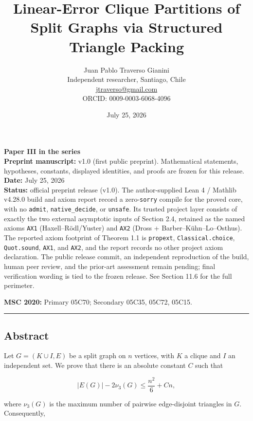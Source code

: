 \documentclass[
  11pt,
]{article}
\title{Linear-Error Clique Partitions of Split Graphs via Structured
Triangle Packing}
\author{Juan Pablo Traverso Gianini\\
\small Independent researcher, Santiago, Chile\\
\small \href{mailto:jtraverso@gmail.com}{jtraverso@gmail.com}\\
\small ORCID: 0009-0003-6068-4096}
\date{July 25, 2026}
\begin{document}
\sloppy
\raggedbottom
\maketitle

\begin{small}\begin{raggedright}
\textbf{Paper III in the series}\\
\textbf{Preprint manuscript:} v1.0 (first public preprint). Mathematical statements, hypotheses, constants, displayed identities, and proofs are frozen for this release.\\
\textbf{Date:} July 25, 2026\\
\textbf{Status:} official preprint release (v1.0). The author-supplied Lean 4 / Mathlib v4.28.0 build and axiom report record a zero-\texttt{sorry} compile for the proved core, with no \texttt{admit}, \texttt{native\_decide}, or \texttt{unsafe}. Its trusted project layer consists of exactly the two external asymptotic inputs of Section 2.4, retained as the named axioms \texttt{AX1} (Haxell--Rödl/Yuster) and \texttt{AX2} (Dross + Barber--Kühn--Lo--Osthus). The reported axiom footprint of Theorem 1.1 is \texttt{propext}, \texttt{Classical.choice}, \texttt{Quot.sound}, \texttt{AX1}, and \texttt{AX2}, and the report records no other project axiom declaration. The public release commit, an independent reproduction of the build, human peer review, and the prior-art assessment remain pending; final verification wording is tied to the frozen release. See Section 11.6 for the full perimeter.

\textbf{MSC 2020:} Primary 05C70; Secondary 05C35, 05C72, 05C15.
\begin{center}\rule{0.5\linewidth}{0.5pt}\end{center}
\end{raggedright}\end{small}

\subsection{Abstract}\label{abstract}

Let \(G=(K\cup I,E)\) be a split graph on \(n\) vertices, with \(K\) a
clique and \(I\) an independent set. We prove that there is an absolute
constant \(C\) such that

\[
|E(G)|-2\nu_3(G)
\le
\frac{n^2}{6}+Cn,
\]

where \(\nu_3(G)\) is the maximum number of pairwise edge-disjoint
triangles in \(G\). Consequently,
\end{document}
